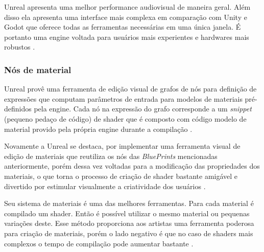 Unreal apresenta uma melhor performance audiovisual de maneira geral. Além disso ela apresenta uma interface mais complexa em comparação com Unity e Godot que oferece todas as ferramentas necessárias em uma única janela. É portanto uma engine voltada para usuários mais experientes e hardwares mais robustos \cite{stelios2017}.
 
\subsubsection{Nós de material}
\label{sec:material-nodes}

Unreal provê uma ferramenta de edição visual de grafos de nós para definição de expressões que computam parâmetros de entrada para modelos de materiais pré-definidos pela engine. Cada nó na expressão do grafo corresponde a um \textit{snippet} (pequeno pedaço de código) de shader que é composto com código modelo de material provido pela própria engine durante a compilação \cite{he2016rapid}.

Novamente a Unreal se destaca, por implementar uma ferramenta visual de edição de materiais que reutiliza os nós das \textit{BluePrints} mencionadas anteriormente, porém dessa vez voltadas para a modificação das propriedades dos materiais, o que torna o processo de criação de shader bastante amigável e divertido por estimular visualmente a criatividade dos usuários \cite{compStudyGE}. 

\begin{figure}[h!]
	\centering
\end{figure}
\nocite{materialUnreal}

Seu sistema de materiais é uma das melhores ferramentas. Para cada material é compilado um shader. Então é possível utilizar o mesmo material ou pequenas variações deste. Esse método proporciona aos artistas uma ferramenta poderosa para criação de materiais, porém o lado negativo é que no caso de shaders mais complexos o tempo de compilação pode aumentar bastante \cite{vsmid2017comparison}.

